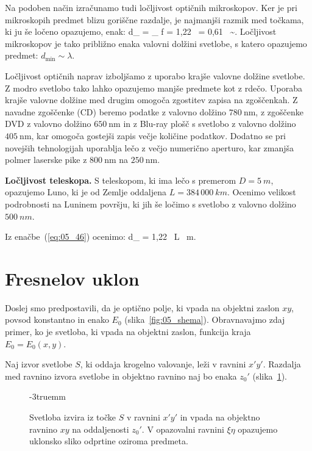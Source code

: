 Na podoben način izračunamo tudi ločljivost optičnih mikroskopov. Ker
je pri mikroskopih predmet blizu goriščne razdalje, je najmanjši 
razmik med točkama, ki ju še ločeno opazujemo, enak:
\beq
d_ = \alpha_{} f = 1,22~ = 
0,61~ \sim \lambda.
\label{eq:05_46aa}
\eeq
Ločljivost mikroskopov je tako približno enaka 
valovni dolžini svetlobe, s katero opazujemo predmet: 
$d_\mathrm{min} \sim \lambda$.

\begin{remark}
Ločljivost optičnih naprav izboljšamo z uporabo krajše valovne dolžine svetlobe.
Z modro svetlobo tako lahko opazujemo manjše predmete
kot z rdečo. Uporaba krajše valovne dolžine med drugim omogoča zgostitev 
zapisa na zgoščenkah. Z navadne zgoščenke (CD) beremo podatke z valovno 
dolžino $780~\si{\nano\metre}$, z zgoščenke DVD z valovno dolžino
$650~\si{\nano\metre}$ in z Blu-ray plošč s svetlobo z valovno dolžino
$405~\si{\nano\metre}$, kar omogoča gostejši zapis večje količine podatkov.
Dodatno se pri novejših tehnologijah uporablja lečo z večjo numerično
aperturo, kar zmanjša polmer laserske pike
z $800~\si{\nano\metre}$ na $250~\si{\nano\metre}$.
\end{remark}

\begin{example}{\bf Ločljivost teleskopa.}
S teleskopom, ki ima lečo s premerom $D=5~\si{m}$,
opazujemo Luno, ki je od Zemlje oddaljena $L = 384\,000~\si{km}$. 
Ocenimo velikost podrobnosti na Luninem površju, ki jih še ločimo
s svetlobo z valovno dolžino $500~\si{nm}$. 

Iz enačbe~(\ref{eq:05_46}) ocenimo:
\beq
d_ = 1,22~ L ~\si{m}.
\label{eq:05_47}
\eeq
\end{example}

\section{Fresnelov uklon}
Doslej smo predpostavili, da je optično polje, ki vpada na objektni zaslon $xy$, povsod 
konstantno in enako $E_0$ (slika~\ref{fig:05_shema}). 
Obravnavajmo zdaj primer, ko je svetloba, 
ki vpada na objektni zaslon, funkcija kraja $E_0 = E_0(x,y)$. 

Naj izvor svetlobe $S$, ki oddaja krogelno valovanje, leži v ravnini 
$x'y'$. Razdalja med ravnino izvora svetlobe in objektno ravnino
naj bo enaka $z_0'$ (slika~\ref{fig:05_Fresnel}).
\begin{figure}[ht]
\centering
\def\svgwidth{120truemm} 

\caption{Svetloba izvira iz točke $S$ v ravnini $x'y'$ in vpada na objektno ravnino $xy$ na 
oddaljenosti $z_0'$. V opazovalni ravnini $\xi\eta$ opazujemo uklonsko
sliko odprtine oziroma predmeta.}
\label{fig:05_Fresnel}
\vglue-3truemm
\end{figure}

